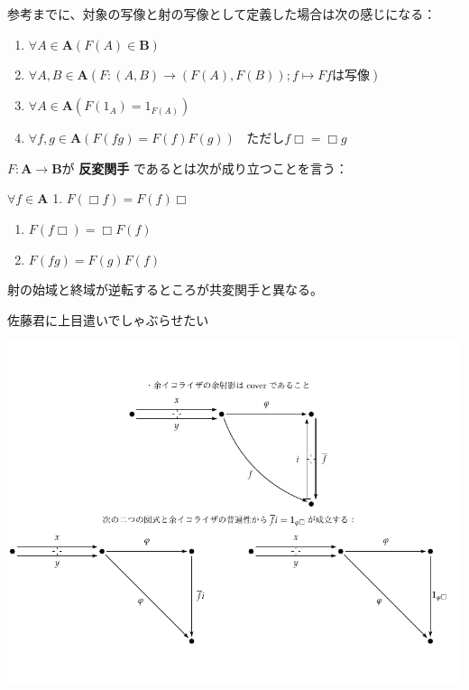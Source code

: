 \documentclass[5pt]{ltjsarticle}
\begin{document}
参考までに、対象の写像と射の写像として定義した場合は次の感じになる：

\begin{enumerate}
\item
  \(\forall A \in \mathbf{A} (F(A) \in \mathbf{B})\)
\item
  \(\forall A,B \in \mathbf{A} (F:(A,B) \to (F(A),F(B));f \mapsto Ff\text{は写像})\)
\item
  \(\forall A \in \mathbf{A} (F(1_A) = 1_{F(A)})\)
\item
  \(\forall f,g \in \mathbf{A} (F(fg) = F(f)F(g))\ \ \ \ \text{ただし}f\Box = \Box g\)
\end{enumerate}


\(F:\mathbf{A} \to \mathbf{B}\)が \textbf{反変関手}
であるとは次が成り立つことを言う：

\(\forall f \in \mathbf{A}\) 1. \(F(\Box f) = F(f)\Box\)

\begin{enumerate}

\item
  \(F(f\Box) = \Box F(f)\)
\item
  \(F(fg) = F(g)F(f)\)
\end{enumerate}

射の始域と終域が逆転するところが共変関手と異なる。

佐藤君に上目遣いでしゃぶらせたい

\includegraphics{test.pdf}
\end{document}
